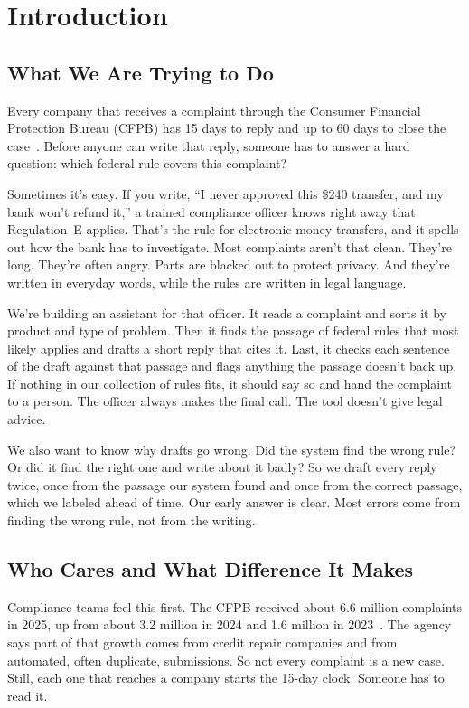 \documentclass[10pt]{article}
\title{\adjustbox{max width=\textwidth}{Regulation-Grounded Triage and Response Drafting for CFPB Consumer Complaints}}
\author{\normalsize\mdseries Aditya Datar \quad Anirudh Joshi \quad Atharva Thorat \quad
  Gagan Shivanna \quad Ishani Bhadlikar \quad Ujjwal Puri \\
  \small\mdseries CSCI 544 Applied NLP \,\textbar\, Group 36 \,\textbar\, Midterm Report}
\begin{document}
\maketitle

\section{Introduction}

\subsection{What We Are Trying to Do}
Every company that receives a complaint through the Consumer Financial
Protection Bureau (CFPB) has 15 days to reply and up to 60 days to close the
case~\cite{cfpb2026process}. Before anyone can write that reply, someone has to
answer a hard question: which federal rule covers this complaint?

Sometimes it's easy. If you write, ``I never approved this \$240 transfer, and my
bank won't refund it,'' a trained compliance officer knows right away that
Regulation~E applies. That's the rule for electronic money transfers, and it
spells out how the bank has to investigate. Most complaints aren't that clean.
They're long. They're often angry. Parts are blacked out to protect privacy. And
they're written in everyday words, while the rules are written in legal
language.

We're building an assistant for that officer. It reads a complaint and sorts it
by product and type of problem. Then it finds the passage of federal rules that
most likely applies and drafts a short reply that cites it. Last, it checks each
sentence of the draft against that passage and flags anything the passage
doesn't back up. If nothing in our collection of rules fits, it should say so and
hand the complaint to a person. The officer always makes the final call. The
tool doesn't give legal advice.

We also want to know why drafts go wrong. Did the system find the wrong rule? Or
did it find the right one and write about it badly? So we draft every reply
twice, once from the passage our system found and once from the correct passage,
which we labeled ahead of time. Our early answer is clear. Most errors come from
finding the wrong rule, not from the writing.

\subsection{Who Cares and What Difference It Makes}\label{sec:whocares}
Compliance teams feel this first. The CFPB received about 6.6 million complaints
in 2025, up from about 3.2 million in 2024 and 1.6 million in
2023~\cite{cfpb2026annual}. The agency says part of that growth comes from credit
repair companies and from automated, often duplicate, submissions. So not every
complaint is a new case. Still, each one that reaches a company starts the
15-day clock. Someone has to read it.
\end{document}
